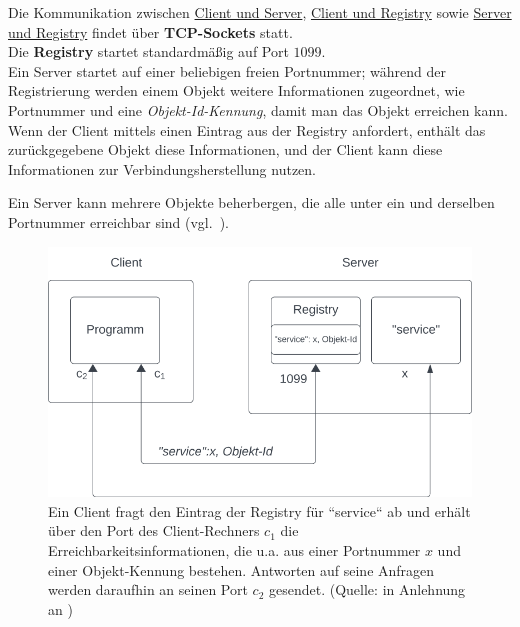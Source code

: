 \noindent
Die Kommunikation zwischen \ul{Client und Server}, \ul{Client und Registry} sowie \ul{Server und Registry} findet über \textbf{TCP-Sockets} statt.\\

\noindent
Die \textbf{Registry} startet standardmäßig auf Port $1099$.\\

\noindent
Ein Server startet auf einer beliebigen freien Portnummer; während der Registrierung werden einem Objekt weitere Informationen zugeordnet, wie Portnummer und eine \textit{Objekt-Id-Kennung}, damit man das Objekt erreichen kann.\\
Wenn der Client mittels  einen Eintrag aus der Registry anfordert, enthält das zurückgegebene Objekt diese Informationen, und der Client kann diese Informationen zur Verbindungsherstellung nutzen.

\begin{tcolorbox}[enlarge top by=0.5cm,enlarge bottom by=0.5cm]
    Ein Server kann mehrere Objekte beherbergen, die alle unter ein und derselben Portnummer erreichbar sind (vgl.~\cite[324]{Oec22}).
\end{tcolorbox}

\begin{figure}
    \centering
    \includegraphics[scale=0.5]{chapters/fopt5/img/rmi/registry}
    \caption{Ein Client fragt den Eintrag der Registry für ``service`` ab und erhält über den Port des Client-Rechners $c_1$ die Erreichbarkeitsinformationen, die u.a. aus einer Portnummer $x$ und einer Objekt-Kennung bestehen.
    Antworten auf seine Anfragen werden daraufhin an seinen Port $c_2$ gesendet. (Quelle: in Anlehnung an \cite[324, Bild 6.5]{Oec22})}
    \label{fig:registry}
\end{figure}

